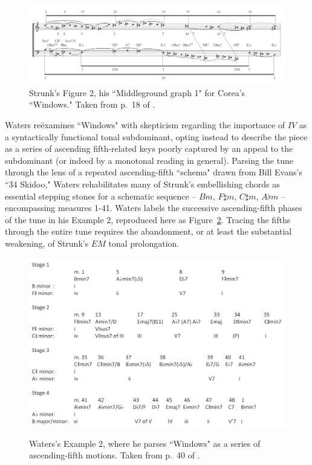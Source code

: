 \begin{figure}
	\centering
	\caption{Strunk's Figure 2, his ``Middleground graph 1" for Corea's ``Windows."  Taken from p.\ 18 of \cite{strunk2016}.}\label{strunk_fig}
	\includegraphics[width=6in]{strunk_windows1.png}
\end{figure}

Waters re\"{e}xamines ``Windows" with skepticism regarding the importance of $IV$ as a syntactically functional tonal subdominant, opting instead to describe the piece as a series of ascending fifth-related keys poorly captured by an appeal to the subdominant (or indeed by a monotonal reading in general).  Parsing the tune through the lens of a repeated ascending-fifth ``schema" drawn from Bill Evans's ``34 Skidoo," Waters rehabilitates many of Strunk's embellishing chords as essential stepping stones for a schematic sequence -- $Bm$, $F\sharp m$, $C\sharp m$, $A\flat m$ -- encompassing measures 1-41.  Waters labels the successive ascending-fifth phases of the tune in his Example 2, reproduced here as Figure~\ref{waters_fig}.  Tracing the fifths through the entire tune requires the abandonment, or at least the substantial weakening, of Strunk's $EM$ tonal prolongation.

\begin{figure}
	\centering
	\caption{Waters's Example 2, where he parses ``Windows" as a series of ascending-fifth motions.  Taken from p.\ 40 of \cite{waters2016}.}
	\includegraphics[width=6in]{waters_windows.png}
	\label{waters_fig}
\end{figure}

